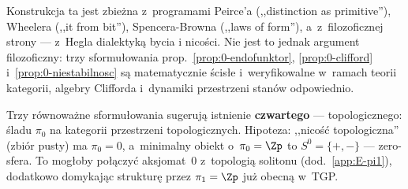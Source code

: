 \begin{remark}\label{rem:0-filozofia}
Konstrukcja ta jest zbie\.zna z~programami Peirce'a (,,distinction
as primitive''), Wheelera (,,it from bit''), Spencera-Browna
(,,laws of form''), a~z~filozoficznej strony --- z~Hegla
dialektyk\k{a} bycia i nicości. Nie jest to jednak argument
filozoficzny: trzy sformu\l{}owania prop.~\ref{prop:0-endofunktor},
\ref{prop:0-clifford} i~\ref{prop:0-niestabilnosc} s\k{a}
matematycznie \'scis\l{}e i~weryfikowalne w~ramach teorii kategorii,
algebry Clifforda i~dynamiki przestrzeni stan\'ow odpowiednio.
\end{remark}

\begin{observation}%
\label{obs:0-linia}
Trzy r\'ownowa\.zne sformu\l{}owania sugeruj\k{a} istnienie
\textbf{czwartego} --- topologicznego: \'sladu $\pi_0$ na kategorii
przestrzeni topologicznych. Hipoteza: ,,nicość topologiczna'' (zbi\'or
pusty) ma $\pi_0 = 0$, a~minimalny obiekt o~$\pi_0 = \Zp$ to
$S^0 = \{+, -\}$ --- zero-sfera. To mog\l{}oby po\l{}\k{a}czy\'c
aksjomat~0 z~topologi\k{a} solitonu (dod.~\ref{app:E-pi1}),
dodatkowo domykaj\k{a}c struktur\k{e} przez $\pi_1 = \Zp$ ju\.z
obecn\k{a} w~TGP.
\end{observation}

